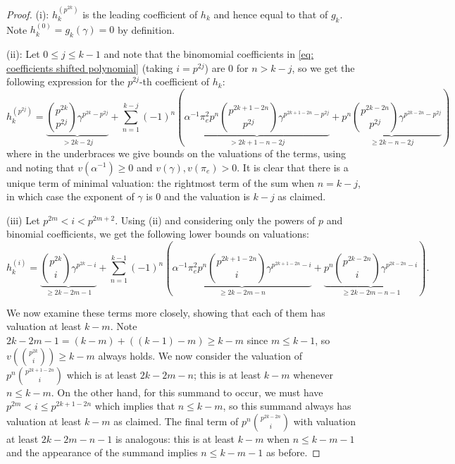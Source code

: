 \documentclass{amsart}
\theoremstyle{definition}
\numberwithin{theorem}{section}
\numberwithin{equation}{section}
\begin{document}
\begin{proof}
(i): $h_k^{(p^{2k})}$ is the leading coefficient of $h_k$ and hence equal to that of $g_k$. Note $h_k^{(0)}=g_k(\gamma)=0$ by definition.

(ii): Let $0 \leq j \leq k-1$ and note that the binomomial coefficients in \eqref{eq: coefficients shifted polynomial} (taking $i=p^{2j}$) are 0 for $n>k-j$, so we get the following expression for the $p^{2j}$-th coefficient of $h_k$:
\[
h_k^{(p^{2j})} = \underbrace{\binom{p^{2k}}{p^{2j}}\gamma^{p^{2k}-p^{2j}}}_{>2k-2j} + \sum_{n=1}^{k-j} (-1)^n \left( \underbrace{\alpha^{-1}\pi_e^2p^n \binom{p^{2k+1-2n}}{p^{2j}}\gamma^{p^{2k+1-2n}-p^{2j}}}_{>2k+1-n-2j} + \underbrace{p^n\binom{p^{2k-2n}}{p^{2j}}\gamma^{p^{2k-2n}-p^{2j}}}_{\geq 2k-n-2j} \right)
\]
where in the underbraces we give bounds on the valuations of the terms, using  and noting that $v(\alpha^{-1}) \geq 0$ and $v(\gamma),v(\pi_e)>0$. It is clear that there is a unique term of minimal valuation: the rightmost term of the sum when $n=k-j$, in which case the exponent of $\gamma$ is $0$ and the valuation is $k-j$ as claimed.

(iii) Let $p^{2m}<i<p^{2m+2}$. Using (ii) and considering only the powers of $p$ and binomial coefficients, we get the following lower bounds on valuations:
\[
h_k^{(i)} = \underbrace{\binom{p^{2k}}{i}\gamma^{p^{2k}-i}}_{{\geq 2k-2m-1}} + \sum_{n=1}^{k-1} (-1)^n \left( \underbrace{\alpha^{-1}\pi_e^2p^n \binom{p^{2k+1-2n}}{i}\gamma^{p^{2k+1-2n}-i}}_{{\geq 2k-2m-n}} + \underbrace{p^n\binom{p^{2k-2n}}{i}\gamma^{p^{2k-2n}-i}}_{{\geq 2k-2m-n-1}} \right).
\]

We now examine these terms more closely, showing that each of them has valuation at least $k-m$. Note $2k-2m-1=(k-m) + ((k-1) - m) \geq k-m$ since $m \leq k-1$, so $v(\binom{p^{2k}}{i}) \geq k-m$ always holds.
We now consider the valuation of $p^n\binom{p^{2k+1-2n}}{i}$ which is at least $2k-2m-n$; this is at least $k-m$ whenever $n \leq k-m$. On the other hand, for this summand to occur, we must have $p^{2m} < i \leq p^{2k+1-2n}$ which implies that $n \leq k-m$, so this summand always has valuation at least $k-m$ as claimed.
The final term of $p^n\binom{p^{2k-2n}}{i}$ with valuation at least $2k-2m-n-1$ is analogous: this is at least $k-m$ when $n \leq k-m-1$ and the appearance of the summand implies $n \leq k-m-1$ as before.
\end{proof}
\end{document}
